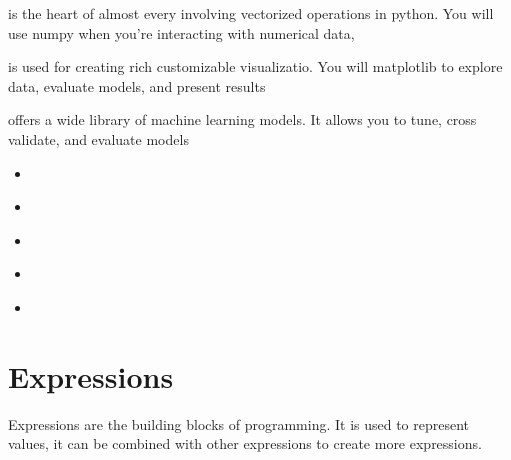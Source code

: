 \documentclass[letterpaper,10pt,english]{jupyterBook}
\begin{document}
\begin{DUlineblock}{0em}
\item[] 
\end{DUlineblock}

\sphinxAtStartPar
{} is the heart of almost every involving vectorized operations in python. You will use numpy when you’re interacting with numerical data,

\begin{DUlineblock}{0em}
\item[] 
\end{DUlineblock}

\sphinxAtStartPar
{} is used for creating rich customizable visualizatio. You will matplotlib to explore data, evaluate models, and present results

\begin{DUlineblock}{0em}
\item[] 
\end{DUlineblock}

\sphinxAtStartPar
{} offers a wide library of machine learning models. It allows you to tune, cross validate, and evaluate models
\begin{itemize}
\item {} 
\sphinxAtStartPar
{\hyperref[\detokenize{expressions::doc}]{}}

\item {} 
\sphinxAtStartPar
{\hyperref[\detokenize{datatypes::doc}]{}}

\item {} 
\sphinxAtStartPar
{\hyperref[\detokenize{first-program::doc}]{}}

\item {} 
\sphinxAtStartPar
{\hyperref[\detokenize{conditionals::doc}]{}}

\item {} 
\sphinxAtStartPar
{\hyperref[\detokenize{loops::doc}]{}}

\end{itemize}

\sphinxstepscope


\chapter{Expressions}
\label{\detokenize{expressions:expressions}}\label{\detokenize{expressions::doc}}
\sphinxAtStartPar
Expressions are the building blocks of programming. It is used to represent values, it can be combined with other expressions to create more expressions.
\end{document}
